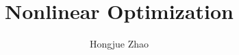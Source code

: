 \documentclass{article}
\title{Nonlinear Optimization}
\author{Hongjue Zhao}
\date{}
\begin{document}
    \maketitle
    {
         \newpage
         \newpage
        
    }
\end{document}
